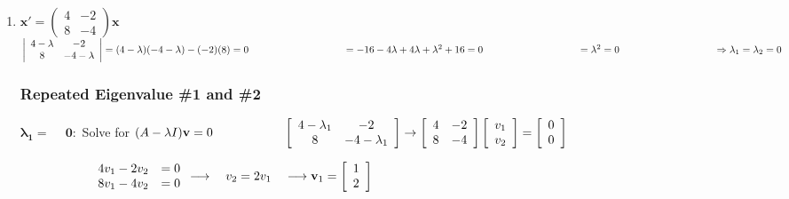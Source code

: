 \documentclass[12pt]{article}
\begin{document}
\begin{enumerate}
    \vspace{12cm}
    
    \item[b)] $\mathbf{x'} = \begin{pmatrix} 4 & -2 \\ 8 & -4 \end{pmatrix} \mathbf{x}$ \\
    $\left| \begin{array}{cc} 4 - \lambda & -2\\ 8 & -4 - \lambda\end{array}\right| 
    = (4 - \lambda)(-4 - \lambda) - (-2)(8) = 0 \\\\
    \hspace*{95pt} = -16 - 4\lambda + 4\lambda + \lambda^2 + 16 = 0 \\\\
    \hspace*{95pt} = \lambda^2 = 0 \\\\
    \hspace*{95pt} \Rightarrow \lambda_1 = \lambda_2 = 0$

    \subsubsection*{Repeated Eigenvalue \#1 and \#2}
    $\mathbf{\lambda_1 = \phantom{-}0}:$ Solve for $(A - \lambda I)\mathbf{v} = 0 \\
    \hspace*{2cm}\left[\begin{array}{cc} 4 - \lambda_1 & -2\\ 8 & -4 - \lambda_1\end{array}\right]
    \rightarrow \left[\begin{array}{rr} 4& -2\\ 8 & -4 \end{array}\right] \left[\begin{array}{cc} v_1 \\ v_2 \end{array}\right] = \left[\begin{array}{cc} 0 \\ 0 \end{array}\right]$

    $\hspace*{2cm}\begin{array}{rr} 4v_1 - 2v_2 &=0 \\ 8v_1 - 4v_2 &=0 \end{array} 
     \longrightarrow \quad v_2=2v_1 \quad \longrightarrow \mathbf{v}_1 =\left[\begin{array}{cc} 1 \\ 2 \end{array}\right]$ \\


\end{enumerate}
\end{document}
